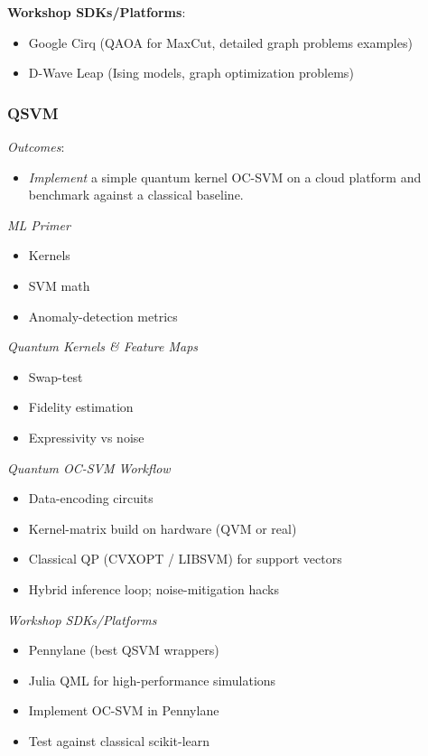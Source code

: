 \textbf{Workshop SDKs/Platforms}:
\begin{itemize}
	\item Google Cirq (QAOA for MaxCut, detailed graph problems examples)
	\item D-Wave Leap (Ising models, graph optimization problems)
\end{itemize}


\subsubsection*{QSVM}

\emph{Outcomes}:
\begin{itemize}
	\item \emph{Implement} a simple quantum kernel OC-SVM on a cloud platform and benchmark against a classical baseline.
\end{itemize}

\emph{ML Primer}
\begin{itemize}
	\item Kernels
	\item SVM math
	\item Anomaly-detection metrics
\end{itemize}

\emph{Quantum Kernels \& Feature Maps}
\begin{itemize}
	\item Swap-test
	\item Fidelity estimation
	\item Expressivity vs noise
\end{itemize}

\emph{Quantum OC-SVM Workflow}
\begin{itemize}
	\item Data-encoding circuits
	\item Kernel-matrix build on hardware (QVM or real)
	\item Classical QP (CVXOPT / LIBSVM) for support vectors
	\item Hybrid inference loop; noise-mitigation hacks
\end{itemize}


\emph{Workshop SDKs/Platforms}
\begin{itemize}
	\item Pennylane (best QSVM wrappers)
	\item Julia QML for high-performance simulations
	\item Implement OC-SVM in Pennylane
	\item Test against classical scikit-learn
\end{itemize}


